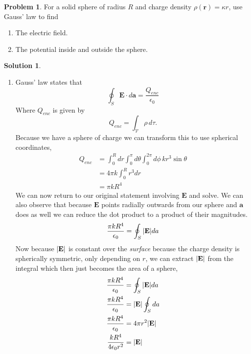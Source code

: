 \documentclass[10pt]{article}
\theoremstyle{definition}
\newtheorem{problem}{Problem}
\newtheorem{soln}{Solution}
\begin{document}
\begin{problem}
For a solid sphere of radius $R$ and charge density $\rho(\mathbf{r}) = \kappa r$, use Gauss' law to find
\begin{enumerate}[label=(\roman*)]
  \item The electric field.
  \item The potential inside and outside the sphere.
\end{enumerate}
\end{problem}
\begin{soln}~
  \begin{enumerate}[label=(\roman*)]
    \item Gauss' law states that
          $$\oint_S \mathbf{E}\cdot d\mathbf{a}=\frac{Q_{enc}}{\epsilon_0}$$
          Where $Q_{enc}$ is given by
          $$Q_{enc}=\int_\mathcal{V}\rho \,d\tau.$$
          Because we have a sphere of charge we can transform this to use spherical coordinates,
          \begin{align*}
            Q_{enc} & =\int_0^R dr \int_0^{\pi} d\theta \int_0^{2\pi}d\phi\,kr^3\sin\theta \\
                    & =4\pi k\int_0^R r^3 dr                                               \\
                    & =\pi kR^4
          \end{align*}
          We can now return to our original statement involving $\mathbf{E}$ and solve. We can also observe that because
          $\mathbf{E}$ points radially outwards from our sphere and $\mathbf{a}$ does as well we can reduce the dot product to a product of their magnitudes.
          $$
            \frac{\pi kR^4}{\epsilon_0}= \oint_S \abs{\mathbf{E}} da
          $$
          Now because $\abs{\mathbf{E}}$ is constant over the \emph{surface} because the charge density is spherically symmetric, only depending on $r$,
          we can extract $\abs{\mathbf{E}}$ from the integral which then just becomes the area of a sphere,
          \begin{align*}
            \frac{\pi kR^4}{\epsilon_0}  & = \oint_S \abs{\mathbf{E}} da  \\
            \frac{\pi kR^4}{\epsilon_0}  & = \abs{\mathbf{E}} \oint_S  da \\
            \frac{\pi kR^4}{\epsilon_0}  & = 4\pi r^2 \abs{\mathbf{E}}    \\
            \frac{kR^4}{4\epsilon_0 r^2} & = \abs{\mathbf{E}}             \\
          \end{align*}

\end{enumerate}
\end{soln}
\end{document}
